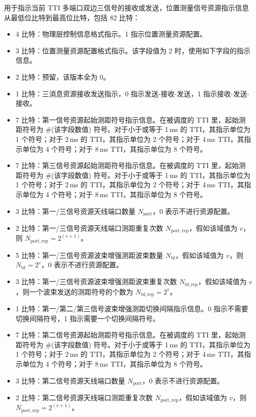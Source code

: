 \documentclass[11pt,a4paper]{ctexart}
\begin{document}
用于指示当前 TTI 多端口双边三信号的接收或发送，位置测量信号资源指示信息从最低位比特到最高位比特，包括 82 比特：
\begin{itemize}[nosep]
  \item 4 比特：物理层控制信息格式指示。1 指示位置测量资源配置。
  \item 3 比特：位置测量资源配置格式指示。该字段值为 2 时，使用如下字段的指示信息。
  \item 2 比特：预留，该版本全为 0。
  \item 1 比特：三消息资源接收发送指示，0 指示发送-接收-发送，1 指示接收-发送-接收。
  \item 7 比特：第一信号资源起始测距符号指示信息。在被调度的 TTI 里，起始测距符号为 \#(该字段数值) 符号。对于小于或等于 1\,ms 的 TTI，其指示单位为 1 个符号；对于 2\,ms 的 TTI，其指示单位为 2 个符号；对于 4\,ms TTI，其指示单位为 4 个符号；对于 8\,ms TTI，其指示单位为 8 个符号。
  \item 7 比特：第三信号资源起始测距符号指示信息。在被调度的 TTI 里，起始测距符号为 \#(该字段数值) 符号。对于小于或等于 1\,ms 的 TTI，其指示单位为 1 个符号；对于 2\,ms 的 TTI，其指示单位为 2 个符号；对于 4\,ms TTI，其指示单位为 4 个符号；对于 8\,ms TTI，其指示单位为 8 个符号。
  \item 3 比特：第一/三信号资源天线端口数量 $N_{\mathrm{port}}$，0 表示不进行资源配置。
  \item 2 比特：第一/三信号资源天线端口测距重复次数 $N_{\mathrm{port,rep}}$，假如该域值为 $v$，则 $N_{\mathrm{port,rep}} = 2^{(v+1)}$。
  \item 5 比特：第一/三信号资源波束增强测距波束数量 $N_{\mathrm{bf}}$，假如该域值为 $v$，则 $N_{\mathrm{bf}} = 2^v$，0 表示不进行资源配置。
  \item 3 比特：第一/三信号资源波束增强测距波束重复次数 $N_{\mathrm{bf,rep}}$，假如该域值为 $v$，则一个波束发送的测距符号的个数为 $N_{\mathrm{bf,rep}} = 2^v$。
  \item 1 比特：第一/第二/第三信号波束增强测距切换间隔指示信息。0 指示不需要切换间隔符号，1 指示需要一个切换间隔符号。
  \item 7 比特：第二信号资源起始测距符号指示信息。在被调度的 TTI 里，起始测距符号为 \#(该字段数值) 符号。对于小于或等于 1\,ms 的 TTI，其指示单位为 1 个符号；对于 2\,ms 的 TTI，其指示单位为 2 个符号；对于 4\,ms TTI，其指示单位为 4 个符号；对于 8\,ms TTI，其指示单位为 8 个符号。
  \item 3 比特：第二信号资源天线端口数量 $N_{\mathrm{port}}$，0 表示不进行资源配置。
  \item 2 比特：第二信号资源天线端口测距重复次数 $N_{\mathrm{port,rep}}$，假如该域值为 $v$，则 $N_{\mathrm{port,rep}} = 2^{(v+1)}$。

\end{itemize}
\end{document}
